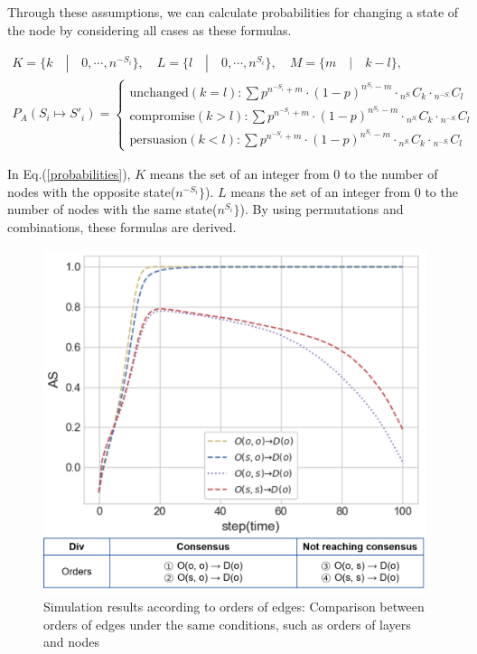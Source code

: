 Through these assumptions, we can calculate probabilities for changing a state of the node by considering all cases as these formulas.  

\begin{equation}
\begin{array}{l}
K = \{ k \quad|\quad 0, \cdots ,{n^{ - {S_i}}}\}, \quad L = \{l \quad|\quad 0, \cdots ,{n^{{S_i}}}\},
\quad M = \{m \quad|\quad k-l\}, \\
{P_A}({S_i} \mapsto {{S'}_i}) = \begin{cases}
\mbox{unchanged}(k = l):\sum {{p^{{n^{ - {S_i}}}+m}} \cdot {{(1 - p)}^{{n^{{S_i}}}-m}} \cdot {}_{{n^{{S_{^i}}}}}{C_k} \cdot {}_{{n^{ - {S_{^i}}}}}{C_l}} \\
\mbox{compromise}(k > l):\sum {{p^{{n^{ - {S_i}}}+m}} \cdot {{(1 - p)}^{{n^{{S_i}}}-m}} \cdot {}_{{n^{{S_{^i}}}}}{C_k} \cdot {}_{{n^{ - {S_{^i}}}}}{C_l}} \\
\mbox{persuasion}(k < l):\sum {{p^{{n^{ - {S_i}}}+m}} \cdot {{(1 - p)}^{{n^{{S_i}}}-m}} \cdot {}_{{n^{{S_{^i}}}}}{C_k} \cdot {}_{{n^{ - {S_{^i}}}}}{C_l}} 
\end{cases}
\end{array}
\label{probabilities}
\end{equation}

In Eq.(\ref{probabilities}), $K$ means the set of an integer from $0$ to the number of nodes with the opposite state(${n^{ - {S_i}}}\}$). $L$ means the set of an integer from $0$ to the number of nodes with the same state(${n^{{S_i}}}\}$). By using permutations and combinations, these formulas are derived.

\begin{figure}[!htb]
	\centering
	\includegraphics[width=\hsize]{figure/chap4_edgeorder.png}
	\caption{Simulation results according to orders of edges: Comparison between orders of edges under the same conditions, such as orders of layers and nodes}
	\label{edgeorder}
\end{figure}

